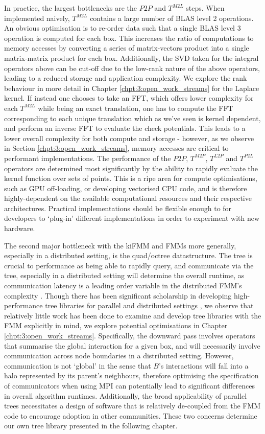 In practice, the largest bottlenecks are the $P2P$ and $T^{M2L}$ steps. When implemented naively, $T^{M2L}$ contains a large number of BLAS level 2 operations. An obvious optimisation is to re-order data such that a single BLAS level 3 operation is computed for each box. This increases the ratio of computations to memory accesses by converting a series of matrix-vectors product into a single matrix-matrix product for each box. Additionally, the SVD taken for the integral operators above can be cut-off due to the low-rank nature of the above operators, leading to a reduced storage and application complexity. We explore the rank behaviour in more detail in Chapter \ref{chpt:3:open_work_streams} for the Laplace kernel. If instead one chooses to take an FFT, which offers lower complexity for each $T^{M2L}$ while being an exact translation, one has to compute the FFT corresponding to each unique translation which as we've seen is kernel dependent, and perform an inverse FFT to evaluate the check potentials. This leads to a lower overall complexity for both compute and storage - however, as we observe in Section \ref{chpt:3:open_work_streams}, memory accesses are critical to performant implementations. The performance of the $P2P$, $T^{M2P}$, $T^{L2P}$ and $T^{P2L}$ operators are determined most significantly by the ability to rapidly evaluate the kernel function over sets of points. This is a ripe area for compute optimisations, such as GPU off-loading, or developing vectorised CPU code, and is therefore highly-dependent on the available computational resources and their respective architectures. Practical implementations should be flexible enough to for developers to `plug-in' different implementations in order to experiment with new hardware.

The second major bottleneck with the kiFMM and FMMs more generally, especially in a distributed setting, is the quad/octree datastructure. The tree is crucial to performance as being able to rapidly query, and communicate via the tree, especially in a distributed setting will determine the overall runtime, as communication latency is a leading order variable in the distributed FMM's complexity \cite{Yokota2014}. Though there has been significant scholarship in developing high-performance tree libraries for parallel and distributed settings \cite{BursteddeWilcoxGhattas11,sundar2008bottom,sundar2013hyksort}, we observe that relatively little work has been done to examine and develop tree libraries with the FMM explicitly in mind, we explore potential optimisations in Chapter \ref{chpt:3:open_work_streams}. Specifically, the downward pass involves operators that summarise the global interaction for a given box, and will necessarily involve communication across node boundaries in a distributed setting. However, communication is not `global' in the sense that $B$'s interactions will fall into a halo represented by its parent's neighbours, therefore optimising the specification of communicators when using MPI can potentially lead to significant differences in overall algorithm runtimes. Additionally, the broad applicability of parallel trees necessitates a design of software that is relatively de-coupled from the FMM code to encourage adoption in other communities. These two concerns determine our own tree library presented in the following chapter.
